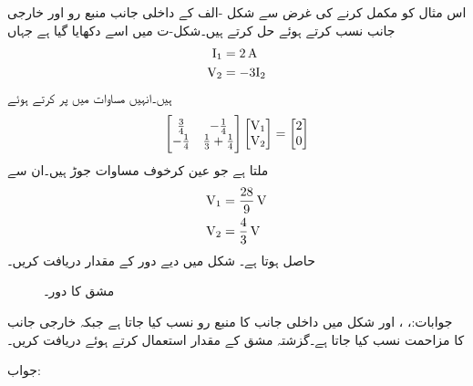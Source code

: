 اس مثال کو مکمل کرنے کی غرض سے  شکل -الف کے داخلی جانب منبع رو اور خارجی جانب  نسب کرتے ہوئے حل کرتے ہیں۔شکل-ت میں اسے دکھایا گیا ہے جہاں
\begin{align*}
{\ensuremath{{\textup{I}}}}_1&=\SI{2}{\ampere}\\
{{\textup{V}}}_2&=-3{{\textup{I}}}_2
\end{align*}
ہیں۔انہیں مساوات  میں پر کرتے ہوئے 
\begin{align*}
\begin{bmatrix}
\frac{3}{4} & -\frac{1}{4}\\
-\frac{1}{4}& \frac{1}{3}+\frac{1}{4}
\end{bmatrix}
\begin{bmatrix}
{\ensuremath{{\textup{V}}}}_1\\
{{\textup{V}}}_2
\end{bmatrix}
=
\begin{bmatrix}
2\\
0
\end{bmatrix}
\end{align*}
ملتا ہے جو عین کرخوف مساوات جوڑ ہیں۔ان سے 
\begin{align*}
{\ensuremath{{\textup{V}}}}_1&=\frac{28}{9}\, \si{\volt}\\
{{\textup{V}}}_2&=\frac{4}{3} \, \si{\volt}
\end{align*}
حاصل ہوتا ہے۔ 
شکل  میں دیے دور کے  مقدار دریافت کریں۔
\begin{figure}
\centering
{}
\caption{مشق  کا دور۔}
\label{شکل_نمونہ_مشق_الف}
\end{figure}

جوابات:، ،  اور 
شکل  میں داخلی جانب  کا منبع رو نسب کیا جاتا ہے جبکہ خارجی جانب  کا مزاحمت نسب کیا جاتا ہے۔گزشتہ مشق کے  مقدار استعمال کرتے ہوئے  دریافت کریں۔

جواب:

